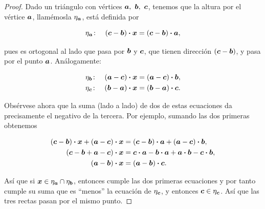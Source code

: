 \documentclass{article}
\theoremstyle{definicion}
\theoremstyle{definition}             %
\theoremstyle{definition}             %
\theoremstyle{definition}
\theoremstyle{definition}
\theoremstyle{observacion}
\theoremstyle{definition}
\theoremstyle{plain}
\theoremstyle{definition}
\theoremstyle{afirmacion}
\theoremstyle{notation}
\theoremstyle{definition}
\begin{document}
        \begin{proof}
            Dado un triángulo con vértices \(\vb*{a},\ \vb*{b},\ \vb*{c}\), tenemos que la altura por el vértice \(\vb*{a}\), llamémosla \(\eta_{\vb*{a}}\), está definida por

            \begin{equation*}
                \eta_{\vb*{a}} \colon\quad (\vb*{c} - \vb*{b}) \vdot \vb*{x} = (\vb*{c} - \vb*{b}) \vdot \vb*{a},
            \end{equation*}
            
            pues es ortogonal al lado que pasa por \(\vb*{b}\) y \(\vb*{c}\), que tienen dirección \((\vb*{c} - \vb*{b})\), y pasa por el punto \(\vb*{a}\). Análogamente:

            \begin{align*}
                \eta_{\vb*{b}} \colon\quad (\vb*{a} - \vb*{c}) \vdot \vb*{x} &= (\vb*{a} - \vb*{c}) \vdot \vb*{b},\\
                \eta_{\vb*{c}} \colon\quad (\vb*{b} - \vb*{a}) \vdot \vb*{x} &= (\vb*{b} - \vb*{a}) \vdot \vb*{c}.
            \end{align*}

            Obsérvese ahora que la suma (lado a lado) de dos de estas ecuaciones da precisamente el negativo de la tercera. Por ejemplo, sumando las dos primeras obtenemos

            \begin{align*}
                (\vb*{c} - \vb*{b}) \vdot \vb*{x} + (\vb*{a} - \vb*{c}) \vdot \vb*{x} &= (\vb*{c} - \vb*{b}) \vdot \vb*{a} + (\vb*{a} - \vb*{c}) \vdot \vb*{b},\\
                (\vb*{c} - \vb*{b} + \vb*{a} - \vb*{c}) \vdot \vb*{x} &= \vb*{c} \vdot \vb*{a} - \vb*{b} \vdot \vb*{a} + \vb*{a} \vdot \vb*{b} - \vb*{c} \vdot \vb*{b},\\
                (\vb*{a} - \vb*{b}) \vdot \vb*{x} &= (\vb*{a} - \vb*{b}) \vdot \vb*{c}.
            \end{align*}

            Así que si \(\vb*{x} \in \eta_{\vb*{a}} \cap \eta_{\vb*{b}}\), entonces cumple las dos primeras ecuaciones y por tanto cumple su suma que es ``menos'' la ecuación de \(\eta_{\vb*{c}}\), y entonces \(\vb*{c} \in \eta_{\vb*{c}}\). Así que las tres rectas pasan por el mismo punto.
        \end{proof}
\end{document}
